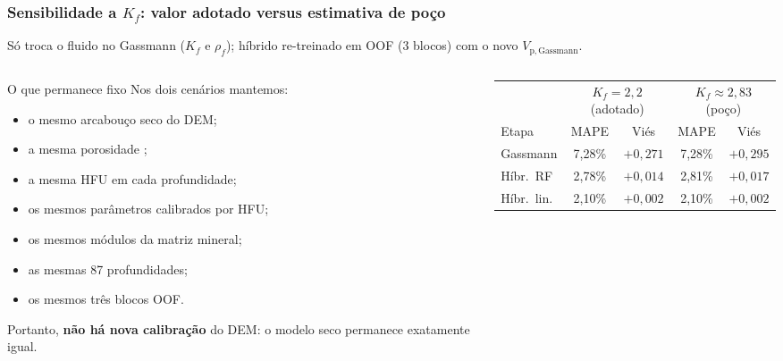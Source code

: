 \documentclass[aspectratio=169,10pt]{beamer}
\begin{document}
\begin{frame}[shrink=8]
  \frametitle{Sensibilidade a $K_f$: valor adotado versus estimativa de poço}
  \scriptsize
  Só troca o fluido no Gassmann ($K_f$ e $\rho_f$);
  híbrido re-treinado em OOF (3 blocos) com o novo
  $V_{\mathrm{p,Gassmann}}$.
  \vspace{0.04cm}
  \begin{columns}[T,onlytextwidth]
    \begin{column}{0.46\textwidth}
      \begin{block}{O que permanece fixo}
        \tiny
        Nos dois cenários mantemos:
        \begin{itemize}\setlength{\itemsep}{0.05em}\setlength{\parsep}{0pt}
          \item o mesmo arcabouço seco do DEM;
          \item a mesma porosidade \phiND{};
          \item a mesma HFU em cada profundidade;
          \item os mesmos parâmetros calibrados por HFU;
          \item os mesmos módulos da matriz mineral;
          \item as mesmas 87 profundidades;
          \item os mesmos três blocos OOF.
        \end{itemize}
        \vspace{0.04cm}
        Portanto, \textbf{não há nova calibração} do DEM:
        o modelo seco permanece exatamente igual.
      \end{block}
    \end{column}
    \begin{column}{0.52\textwidth}
      \centering
      \scriptsize
      \setlength{\tabcolsep}{3.2pt}
      \begin{tabular}{lcccc}
        \toprule
        & \multicolumn{2}{c}{$K_f=2{,}2$ (adotado)} &
          \multicolumn{2}{c}{$K_f\approx 2{,}83$ (poço)} \\
        \cmidrule(lr){2-3}\cmidrule(lr){4-5}
        Etapa & MAPE & Viés & MAPE & Viés \\
        \midrule
        Gassmann & 7,28\% & $+0{,}271$ & 7,28\% & $+0{,}295$ \\
        Híbr.\ RF & 2,78\% & $+0{,}014$ & 2,81\% & $+0{,}017$ \\
        Híbr.\ lin. & 2,10\% & $+0{,}002$ & 2,10\% & $+0{,}002$ \\
        \bottomrule
      \end{tabular}

\end{column}
\end{columns}
\end{frame}
\end{document}
